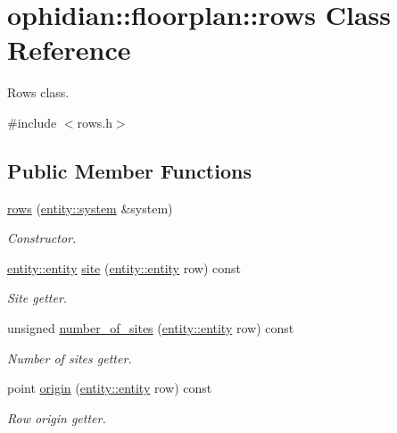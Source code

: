 \hypertarget{classophidian_1_1floorplan_1_1rows}{\section{ophidian\-:\-:floorplan\-:\-:rows Class Reference}
\label{classophidian_1_1floorplan_1_1rows}
}


Rows class.  




{\ttfamily \#include $<$rows.\-h$>$}

\subsection*{Public Member Functions}
\begin{DoxyCompactItemize}
\item 
\hyperlink{classophidian_1_1floorplan_1_1rows_a615ba2d1e4ca91c9faf91e9f2d53efed}{rows} (\hyperlink{classophidian_1_1entity_1_1system}{entity\-::system} \&system)
\begin{DoxyCompactList}\small\item\em Constructor. \end{DoxyCompactList}\item 
\hyperlink{classophidian_1_1entity_1_1entity}{entity\-::entity} \hyperlink{classophidian_1_1floorplan_1_1rows_ad752fabe326be190ca1db1c6f3041a05}{site} (\hyperlink{classophidian_1_1entity_1_1entity}{entity\-::entity} row) const 
\begin{DoxyCompactList}\small\item\em Site getter. \end{DoxyCompactList}\item 
unsigned \hyperlink{classophidian_1_1floorplan_1_1rows_a4f502b7792681191ab717db70370622e}{number\-\_\-of\-\_\-sites} (\hyperlink{classophidian_1_1entity_1_1entity}{entity\-::entity} row) const 
\begin{DoxyCompactList}\small\item\em Number of sites getter. \end{DoxyCompactList}\item 
point \hyperlink{classophidian_1_1floorplan_1_1rows_a7dd1c9c3743ca06933fa6fc120e65d57}{origin} (\hyperlink{classophidian_1_1entity_1_1entity}{entity\-::entity} row) const 
\begin{DoxyCompactList}\small\item\em Row origin getter. \end{DoxyCompactList}\item 

\end{DoxyCompactItemize}
